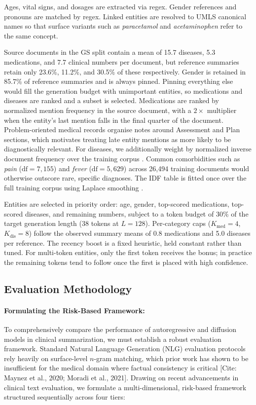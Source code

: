 \documentclass[11pt]{article}
\begin{document}
Ages, vital signs, and dosages are extracted via regex. Gender references and
pronouns are matched by regex.
Linked entities are resolved to UMLS canonical names \citep{bodenreider2004umls}
so that surface variants such as \textit{paracetamol} and
\textit{acetaminophen} refer to the same concept.

Source documents in the GS split contain a mean of 15.7 diseases, 5.3
medications, and 7.7 clinical numbers per document, but reference summaries
retain only 23.6\%, 11.2\%, and 30.5\% of these respectively. Gender is %
retained in 85.7\% of reference summaries and is always pinned. Pinning
everything else would fill the generation budget with unimportant entities, so
medications and diseases are ranked and a subset is selected. Medications are
ranked by normalized mention frequency in the source document, with a $2\times$
multiplier when the entity's last mention falls in the final quarter of the
document. Problem-oriented medical records \citep{weed1968} organise notes around
Assessment and Plan sections, which motivates treating late entity mentions
as more likely to be diagnostically relevant. For diseases, we additionally weight by
normalized inverse document frequency over the training corpus
\citep{sparckjones1972}. Common comorbidities such as \textit{pain}
($\mathrm{df} = 7{,}155$) and \textit{fever} ($\mathrm{df} = 5{,}629$) across
26,494 training documents would otherwise outscore rare, specific diagnoses.
The IDF table is fitted once over the full training corpus using Laplace
smoothing \citep{manning2008introduction}.

Entities are selected in priority order: age, gender, top-scored medications,
top-scored diseases, and remaining numbers, subject to a token budget of
30\% of the target generation length (38 tokens at $L = 128$). Per-category
caps ($K_\mathrm{med} = 4$, $K_\mathrm{dis} = 8$) follow the observed summary
means of 0.8 medications and 5.0 diseases per reference. The recency boost is a fixed heuristic, held constant rather than tuned. For multi-token entities, only the first token
receives the bonus; in practice the remaining tokens tend to follow once the
first is placed with high confidence.

\subsection{Evaluation Methodology}

\paragraph{Formulating the Risk-Based Framework:}
To comprehensively compare the performance of autoregressive and diffusion models in clinical summarization, we must establish a robust evaluation framework. Standard Natural Language Generation (NLG) evaluation protocols rely heavily on surface-level $n$-gram matching, which prior work has shown to be insufficient for the medical domain where factual consistency is critical [Cite: Maynez et al., 2020; Moradi et al., 2021]. Drawing on recent advancements in clinical text evaluation, we formulate a multi-dimensional, risk-based framework structured sequentially across four tiers:
\end{document}
